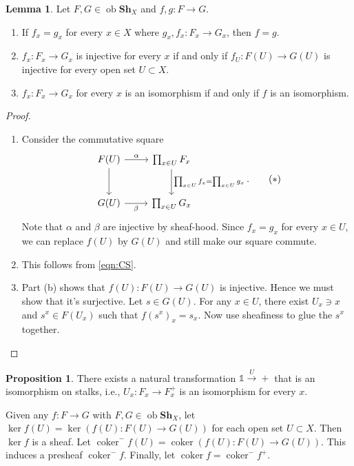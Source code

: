 \documentclass[10pt,letterpaper,cm]{nupset}
\theoremstyle{definition}
\theoremstyle{theorem}
\newtheorem{lemma}[definition]{Lemma}
\newtheorem{prop}[definition]{Proposition}
\theoremstyle{remark}
\newcommand{\1}{\mathbb{1}}
\newcommand{\0}{\vec 0}
\DeclareMathOperator{\ob}{ob}
\DeclareMathOperator{\coker}{coker}
\begin{document}
\begin{lemma}
Let $F, G \in \ob{\mathbf{Sh}_{X}}$ and $f,g : F \to G$. 
\begin{enumerate}[label=(\alph*)]
\item If $f_x = g_x$ for every $x \in X$ where $g_x, f_x : F_x \to G_x$, then $f =g$.
\item $f_x : F_x \to G_x$ is injective for every $x$ if and only if $f_U : F(U) \to G(U)$ is injective for every open set $U \subset X$.
\item $f_x : F_x \to G_x$ for every $x$ is an isomorphism if and only if $f$ is an isomorphism.
\end{enumerate}
\end{lemma}
\begin{proof} $ $
\begin{enumerate}[label=(\alph*)]
\item Consider the commutative square 
\[ \label{eqn:CS}
\begin{tikzcd}[row sep=large]
F(U) \arrow[r, "\alpha"] \arrow[d] & \prod_{x\in U}F_x \arrow[d, "\prod_{x \in U}f_x = \prod_{x \in U} g_x "] \\
G(U) \arrow[r, "\beta"']           & \prod_{x \in U} G_x                                                     
\end{tikzcd}
.\tag{$\ast$}\]  
Note that $\alpha$ and $\beta$ are injective by sheaf-hood. Since $f_x = g_x$ for every $x\in U$, we can replace $f(U)$ by $G(U)$ and still make our square commute.
\item This follows from \eqref{eqn:CS}.
\item Part (b) shows that $f(U) : F(U) \to G(U)$ is injective. Hence we must show that it's surjective. Let $s \in G(U)$. For any $x \in U$, there exist $U_x \ni x$ and $s^x \in F(U_x)$ such that $f(s^x)_x = s_x$. Now use sheafiness to glue the $s^x$ together.
\end{enumerate}
\end{proof}

\begin{prop}
There exists a natural transformation  $\1 \overset{U}{\longrightarrow} +$ that is an isomorphism on stalks, i.e., $U_x : F_x \to F_x^{+}$ is an isomorphism for every $x$.
\end{prop}

\smallskip

Given any $f : F \to G$ with $F, G \in \ob{\mathbf{Sh}_{X}}$, let $\ker{f}(U) = \ker(f(U) : F(U) \to G(U))$ for each open set $U\subset X$. Then $\ker{f}$ is a sheaf. Let $\coker^{-}{f}(U) = \coker(f(U) : F(U) \to G(U))$. This induces a presheaf $\coker^{-}{f}$. Finally, let $\coker{f} = {\coker^{-}{f}}^{+}$.
\end{document}
